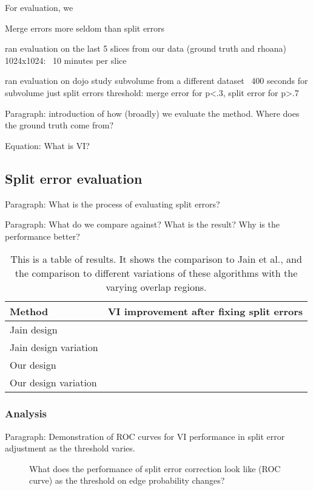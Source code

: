 For evaluation, we 

Merge errors more seldom than split errors

ran evaluation on the last 5 slices from our data (ground truth and rhoana)
1024x1024: ~10 minutes per slice

ran evaluation on dojo study subvolume from a different dataset
~400 seconds for subvolume just split errors
threshold: merge error for p<.3, split error for p>.7




Paragraph: introduction of how (broadly) we evaluate the method. Where does the ground truth come from?

Equation: What is VI?

\subsection{Split error evaluation}

Paragraph: What is the process of evaluating split errors?

Paragraph: What do we compare against? What is the result? Why is the performance better?

\begin{table}[t]
\begin{tabular}{ll}
\toprule
Method & VI improvement after fixing split errors \\
\midrule
Jain design & \\
Jain design variation & \\
Our design &  \\
Our design variation & \\
\bottomrule
\end{tabular}
\caption{This is a table of results. It shows the comparison to Jain et al., and the comparison to different variations of these algorithms with the varying overlap regions.}
\label{tab:spliterrorcorrectionperformance}
\end{table}

\subsubsection{Analysis}

Paragraph: Demonstration of ROC curves for VI performance in split error adjustment as the threshold varies.

\begin{figure}[t]
\missingfigure{}
\caption{What does the performance of split error correction look like (ROC curve) as the threshold on edge probability changes?}
\end{figure}


